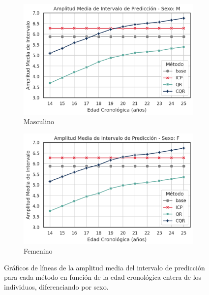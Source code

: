 \begin{figure}[h]
    \centering
    
    \begin{subfigure}[b]{0.49\textwidth}
        \centering
        \includegraphics[width=\textwidth]{capitulos/cap_05/imagenes/AE_MPIW_by_true_age_Male.png}
        \caption{Masculino}
        \label{fig:AE_MPIW_by_true_age_M}
    \end{subfigure}
    \hfill
    \begin{subfigure}[b]{0.49\textwidth}
        \centering
        \includegraphics[width=\textwidth]{capitulos/cap_05/imagenes/AE_MPIW_by_true_age_Female.png}
        \caption{Femenino}
        \label{fig:AE_MPIW_by_true_age_F}
    \end{subfigure}

    \caption[
        Problema de estimación de edad: 
        Gráficos de líneas de la amplitud media del intervalo de predicción para cada método en función de la edad cronológica entera de los individuos, diferenciando por sexo.
    ]{
        Gráficos de líneas de la amplitud media del intervalo de predicción para cada método en función de la edad cronológica entera de los individuos, diferenciando por sexo.
    }
    \label{fig:AE_MPIW_by_true_age}
\end{figure}


